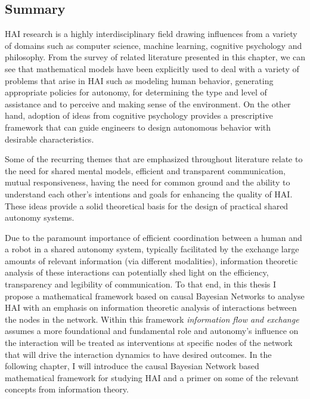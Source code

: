 \documentclass[12pt]{article}
\begin{document}
\subsection{Summary}

HAI research is a highly interdisciplinary field drawing influences from a variety of domains such as computer science, machine learning, cognitive psychology and philosophy. From the survey of related literature presented in this chapter, we can see that mathematical models have been explicitly used to deal with a variety of problems that arise in HAI such as modeling human behavior, generating appropriate policies for autonomy, for determining the type and level of assistance and to perceive and making sense of the environment. On the other hand, adoption of ideas from cognitive psychology provides a prescriptive framework that can guide engineers to design autonomous behavior with desirable characteristics. 

Some of the recurring themes that are emphasized throughout literature relate to the need for shared mental models, efficient and transparent communication, mutual responsiveness, having the need for common ground and the ability to understand each other's intentions and goals for enhancing the quality of HAI. These ideas provide a solid theoretical basis for the design of practical shared autonomy systems. 

Due to the paramount importance of efficient coordination between a human and a robot in a shared autonomy system, typically facilitated by the exchange large amounts of relevant information (via different modalities), information theoretic analysis of these interactions can potentially shed light on the efficiency, transparency and legibility of communication. To that end, in this thesis I propose a mathematical framework based on causal Bayesian Networks to analyse HAI 
with an emphasis on information theoretic analysis of interactions between the nodes in the network. Within this framework \textit{information flow and exchange} assumes a more foundational and fundamental role and autonomy's influence on the interaction will be treated as interventions at specific nodes of the network that will drive the interaction dynamics to have desired outcomes. In the following chapter, I will introduce the causal Bayesian Network based mathematical framework for studying HAI and a primer on some of the relevant concepts from information theory. 
\end{document}
